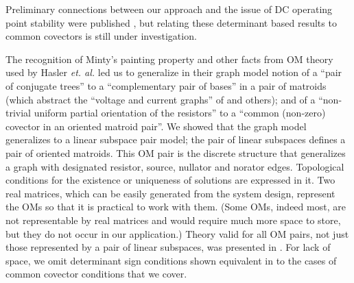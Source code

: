 \documentclass{amsproc-sunycstr}
\theoremstyle{plain}
\theoremstyle{definition}
\theoremstyle{remark}
\newcommand{\extra}[1]{{{#1}}}
\begin{document}
\extra{Preliminary connections between our approach and the 
issue of DC operating point stability \cite{GreenWillNDR} were published
\cite{sdcISCAS98}, but relating these determinant based results
to common covectors is still under investigation.}

The recognition of Minty's painting property\cite{VandewalleChua} 
and other facts
from OM
theory used by Hasler \textit{et. al.} 
\cite{HaslerNeirynck,Fosseprez,HaslerDApplMath} led us to 
generalize in \cite{sdcOMP}
their graph model notion of a ``pair of 
conjugate trees''
to a ``complementary pair of bases''
in a pair of matroids (which abstract the ``voltage and current graphs''
of \cite{ChensBook} and others); and of 
a ``non-trivial uniform partial orientation of the resistors''
to a ``common (non-zero) covector in an oriented matroid pair''.   
We showed that the graph model 
generalizes to a linear subspace pair model;
the pair of linear subspaces defines a pair of oriented matroids.
This OM pair is the discrete structure that
generalizes a graph with designated resistor, source, nullator
and norator edges.
Topological conditions
for the existence or uniqueness of solutions
are expressed in it. 
Two real matrices, which can be easily generated
from the system design, represent the OMs so that 
it is practical to work with them.  (Some OMs, indeed 
most, are not representable by real matrices and would require much more
space to store, but they do not occur in our application.)
Theory valid for all OM pairs, not just those represented by
a pair of linear subspaces, was presented in \cite{sdcOMP}.  For lack of
space, we omit determinant sign conditions shown equivalent
in \cite{sdcOMP} to the cases of common covector conditions that we cover.
\end{document}
